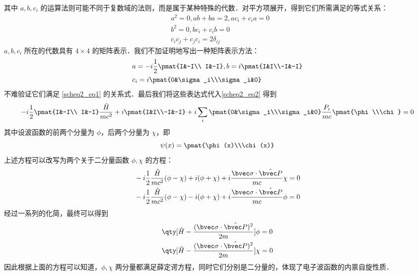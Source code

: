 其中 $a,b,c_i$ 的运算法则可能不同于复数域的法则，而是属于某种特殊的代数．对平方项展开，得到它们所需满足的等式关系：
\begin{equation}\label{scheq2_eq1}
\begin{aligned}
&a^2=0,ab+ba=2,ac_i+c_ia=0\\
&b^2=0,bc_i+c_ib=0\\
&c_ic_j+c_jc_i=2\delta_{ij}
\end{aligned}
\end{equation}
$a,b,c_i$ 所在的代数具有 $4\times 4$ 的矩阵表示．我们不加证明地写出一种矩阵表示方法：
\begin{equation}
\begin{aligned}
&a=-i\frac{1}{2}\pmat{I&-I\\ I&-I},b=i\pmat{I&I\\-I&-I}\\
&c_i=i\pmat{0&\sigma_i\\\sigma_i&0}
\end{aligned}
\end{equation}
不难验证它们满足 \autoref{scheq2_eq1} 的关系式．最后我们将这些表达式代入\autoref{scheq2_eq2} 得到
\begin{equation}
-i\frac{1}{2}\pmat{I&-I\\ I&-I} \frac{\hat H}{mc^2}+i\pmat{I&I\\-I&-I}+i\sum_i\pmat{0&\sigma_i\\\sigma_i&0} \frac{P_i}{mc}\pmat{\phi\\\chi}=0
\end{equation}
其中设波函数的前两个分量为 $\phi$，后两个分量为 $\chi$，即
\begin{equation}\label{scheq2_eq4}
\psi(x)=\pmat{\phi(x)\\\chi(x)}
\end{equation}
上述方程可以改写为两个关于二分量函数 $\phi,\chi$ 的方程：
\begin{equation}
\begin{aligned}
&-i\frac{1}{2}\frac{\hat H}{mc^2}(\phi-\chi)+i(\phi+\chi)+i\frac{\bvec \sigma\cdot \hat{\bvec P}}{mc}\chi=0\\
&-i\frac{1}{2}\frac{\hat H}{mc^2}(\phi-\chi)-i(\phi+\chi)+i\frac{\bvec \sigma\cdot \hat{\bvec P}}{mc}\phi=0
\end{aligned}
\end{equation}
经过一系列的化简，最终可以得到
\begin{equation}\label{scheq2_eq3}
\begin{aligned}
&\qty[\hat H-\frac{(\bvec \sigma\cdot \hat{\bvec P})^2}{2m}]\phi=0\\
&
\qty[\hat H-\frac{(\bvec \sigma\cdot \hat{\bvec P})^2}{2m}]\chi=0
\end{aligned}
\end{equation}
因此根据上面的方程可以知道，$\phi,\chi$ 两分量都满足薛定谔方程，同时它们分别是二分量的，体现了电子波函数的内禀自旋性质．

